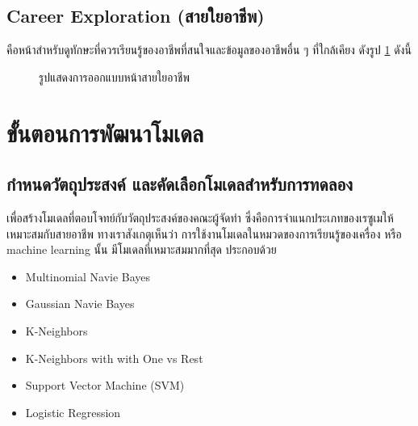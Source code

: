 \subsection{Career Exploration (สายใยอาชีพ)}
คือหน้าสำหรับดูทักษะที่ควรเรียนรู้ของอาชีพที่สนใจและข้อมูลของอาชีพอื่น ๆ ที่ใกล้เคียง ดังรูป \ref{fig:CE.png} ดังนี้
\begin{figure}[H]\centering
    \caption{รูปแสดงการออกแบบหน้าสายใยอาชีพ}\label{fig:CE.png}
\end{figure}

\section{ขั้นตอนการพัฒนาโมเดล}
\subsection{กำหนดวัตถุประสงค์ และคัดเลือกโมเดลสำหรับการทดลอง}
เพื่อสร้างโมเดลที่ตอบโจทย์กับวัตถุประสงค์ของคณะผู้จัดทำ ซึ่งคือการจำแนกประเภทของเรซูเมให้เหมาะสมกับสายอาชีพ ทางเราสังเกตุเห็นว่า การใช้งานโมเดลในหมวดของการเรียนรู้ของเครื่อง หรือ machine learning นั้น มีโมเดลที่เหมาะสมมากที่สุด ประกอบด้วย
\begin{itemize}
    \item Multinomial Navie Bayes
    \item Gaussian Navie Bayes
    \item K-Neighbors
    \item K-Neighbors with with One vs Rest
    \item Support Vector Machine (SVM)
    \item Logistic Regression
\end{itemize}

